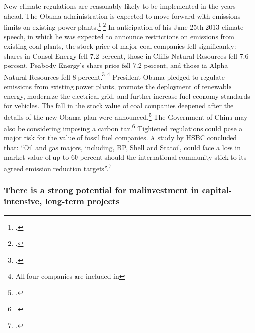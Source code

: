 \documentclass[10pt]{article}
\begin{document}
New climate regulations are reasonably likely to be implemented in the years ahead.
The Obama administration is expected to move forward with emissions limits on existing power plants.\footcite[][]{ReadyingLimits} \footcite[][]{ObamaJune2013}
In anticipation of his June 25th 2013 climate speech, in which he was expected to announce restrictions on  emissions from existing coal plants, the stock price of major coal companies fell significantly: shares in Consol Energy fell 7.2 percent, those in Cliffs Natural Resources fell 7.6 percent, Peabody Energy's share price fell 7.2 percent, and those in Alpha Natural Resources fell 8 percent.\footcite[][]{CoalSharesPlunge} \footnote{All four companies are included in }
President Obama pledged to regulate  emissions from existing power plants, promote the deployment of renewable energy, modernize the electrical grid, and further increase fuel economy standards for vehicles.
The fall in the stock value of coal companies deepened after the details of the new Obama plan were announced.\footcite[][]{CCPlanPoundsCoal}
The Government of China may also be considering imposing a carbon tax.\footcite[][]{ChinaTaxingCarbon}
Tightened regulations could pose a major risk for the value of fossil fuel companies.
A study by HSBC concluded that: ``Oil and gas majors, including, BP, Shell and Statoil, could face a loss in market value of up to 60 percent should the international community stick to its agreed emission reduction targets''.\footcite[][]{EconomicCase}



	\subsubsection{There is a strong potential for malinvestment in capital-intensive, long-term projects}
\end{document}
